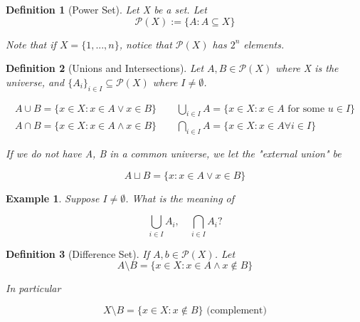 \documentclass[11pt, oneside]{book}
\theoremstyle{break}
\newtheorem{defn}{Definition}[section]
\newtheorem{eg}{Example}[section]
\begin{document}
\begin{defn}[Power Set]
	Let X be a set. Let
	\begin{equation}
		\mathcal{P}(X) := \{A : A \subseteq X\}
	\end{equation}

	Note that if $X = \{1, ..., n\}$, notice that $\mathcal{P}(X)$ has $2^n$ elements.
\end{defn}

\begin{defn}[Unions and Intersections]
	Let $A, B \in \mathcal{P}(X)$ where X is the universe, and $\{A_i\}_{i \in I} \subseteq \mathcal{P}(X)$ where $I \neq \emptyset$.

	\begin{gather*}
		A \cup B = \{ x \in X : x \in A \lor x \in B \} \qquad \bigcup_{i \in I} A = \{x \in X : x \in A \text{ for some } u \in I\} \\
		A \cap B = \{ x \in X : x \in A \land x \in B \} \qquad \bigcap_{i \in I} A = \{ x \in X : x \in A \forall i \in I \}
	\end{gather*}

	If we do not have A, B in a common universe, we let the "external union" be

	\begin{equation}
		A \sqcup B = \{x : x \in A \lor x \in B \}
	\end{equation}
\end{defn}

\begin{eg}
	Suppose $I \neq \emptyset$. What is the meaning of

	\begin{equation}
		\bigcup_{i \in I} A_i, \quad \bigcap_{i \in I} A_i?
	\end{equation}


\end{eg}

\begin{defn}[Difference Set]
	If $A, b \in \mathcal{P}(X)$. Let
	\begin{equation}
		A \setminus B = \{x \in X: x \in A \land x \notin B\}
	\end{equation}

	In particular

	\begin{equation}
		X \setminus B = \{x \in X: x \notin B\} \text{ (complement)}
	\end{equation}
\end{defn}
\end{document}
